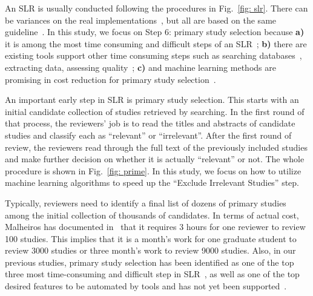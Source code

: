 \documentclass{svjour3}
\theoremstyle{break}
\begin{document}
An SLR is usually conducted following the procedures in Fig.~\ref{fig: slr}. There can be variances on the real
implementations~\cite{wahono2015systematic,malhotra2015systematic,radjenovic2013software,unterkalmsteiner2012evaluation,hall2012systematic},
but all are based on the same guideline~\cite{keele2007guidelines}. In this
study, we focus on Step 6: primary study selection because \textbf{a)} it is among the most time consuming and difficult steps of an SLR~\cite{carver2013identifying}; \textbf{b)} there are existing tools support other time consuming steps such as searching databases~\cite{Molleri:2015:SWA:2745802.2745825,hernandes2012using}, extracting data\cite{Molleri:2015:SWA:2745802.2745825,hernandes2012using,fernandez2010slr,bowes2012slurp}, assessing quality~\cite{fernandez2010slr,bowes2012slurp,Molleri:2015:SWA:2745802.2745825}; \textbf{c)} and machine learning methods are promising in cost reduction for primary study selection~\cite{wallace2010semi,grossman2013}.

 


An important early step in SLR is primary study selection. This starts with an initial candidate collection of studies retrieved by searching. In the first round of that process,
the reviewers' job is to read the titles and abstracts of candidate studies and classify each as ``relevant'' or ``irrelevant''. After the first round of review, the reviewers read through the full text of the previously included studies and make further decision on whether it is actually ``relevant'' or not. The whole procedure is shown in Fig.~\ref{fig: prime}. In this study, we focus on how to utilize machine learning algorithms to speed up the ``Exclude Irrelevant Studies'' step.

Typically, reviewers need to identify a final list of dozens of primary studies
among the initial collection of thousands of candidates. In terms of actual
cost, Malheiros has documented in~\cite{malheiros2007visual} that it requires 3
hours for one reviewer to review 100 studies.  This implies that it is a month's
work for one graduate student to review 3000 studies or three month's work to
review 9000 studies. Also, in our previous studies, primary
study selection has been identified as one of the top three most time-consuming
and difficult step in SLR~\cite{carver2013identifying}, as well as one of the
top desired features to be automated by tools and has not yet been
supported~\cite{hassler2014outcomes,hassler2016identification,marshall2015tools,marshall2014tools}.
\end{document}
